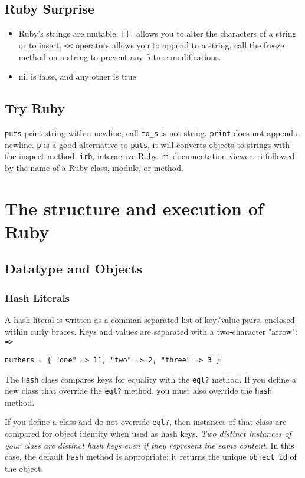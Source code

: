 \documentclass[11pt, a4paper]{book}
\begin{document}
\section{Ruby Surprise}
\begin{itemize}
    \item Ruby's strings are mutable, \verb|[]=| allows you to alter the
    characters of a string or to insert, \verb|<<| operators allows you to
    append to a string, call the freeze method on a string to prevent any future
    modifications.
    \item nil is false, and any other is true

\end{itemize}
\section{Try Ruby}
\verb|puts| print string with a newline, call \verb|to_s| is not string.
\verb|print| does not append a newline. \verb|p| is a good alternative to
\verb|puts|, it will converts objects to strings with the inspect method.
\verb|irb|, interactive Ruby. \verb|ri| documentation viewer. ri followed by the
name of a Ruby class, module, or method.
\chapter{The structure and execution of Ruby}
\section{Datatype and Objects}
\subsection{Hash Literals}
A hash literal is written as a comman-separated list of key/value pairs,
enclosed within curly braces. Keys and values are separated with a two-character
"arrow": \verb|=>|
\begin{verbatim}
numbers = { "one" => 11, "two" => 2, "three" => 3 }
\end{verbatim}

The \verb|Hash| class compares keys for equality with the \verb|eql?| method. If
you define a new class that override the \verb|eql?| method, you must also
override the \verb|hash| method. 

If you define a class and do not override \verb|eql?|, then instances of that
class are compared for object identity when used as hash keys. \emph{Two
distinct instances of your class are distinct hash keys even if they represent
the same content}. In this case, the default \verb|hash| method is appropriate:
it returns the unique \verb|object_id| of the object.
\end{document}
